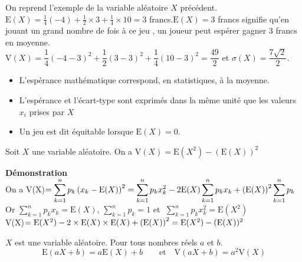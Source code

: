 \begin{example}
On reprend l'exemple de la variable aléatoire $ X $ précédent.\\ $\text{E}(X)=\frac{1}{4}(-4)+\frac{1}{2}\times 3 +\frac{1}{4}\times 10 =3$ francs.\quad $ \text{E}(X)=3$ francs    signifie qu'en jouant un grand  nombre de fois  à ce jeu , un joueur peut espérer gagner $ 3$ francs    en moyenne.\\ $ \text{V}(X)= \dfrac{1}{4}(-4-3)^{2}+\dfrac{1}{2}(3-3)^{2}+\dfrac{1}{4}(10-3)^{2}=\dfrac{49}{2} $ \;\;et \quad $ \sigma(X)=\dfrac{7\sqrt{2}}{2} $.
\end{example}
\begin{remark}
\begin{itemize}
\item   L'espérance mathématique correspond, en statistiques, à la moyenne.
\item L'espérance et l'écart-type sont exprimés dans la même unité que les valeurs $ x_{i} $ prises par $ X $
\item Un jeu est dit équitable lorsque $ \text{E}(X)=0.$
\end{itemize}
\end{remark}
\begin{property}
Soit $ X  $ une  variable aléatoire. On a \; $ \text{V}(X)=  \text{E}(X^{2})- (\text{E}(X))^{2} $
\end{property}
\textbf{Démonstration}\\
On a V(X)$ =\displaystyle\sum_{k=1}^n p_{k}\left(x_{k}-\text{E}(X)\right)^{2}=\displaystyle\sum_{k=1}^n p_{k}x_{k}^{2}-2\text{E}(X)\displaystyle\sum_{k=1}^n p_{k}x_{k}+ \left(\text{E}(X)\right)^{2}\displaystyle\sum_{k=1}^n p_{k}$\\
Or $\displaystyle \sum_{k=1}^n p_{k}x_{k}=\text{E}(X) $,\;  $\displaystyle\sum_{k=1}^n p_{k}=1  $\; et  $\;\displaystyle \sum_{k=1}^n p_{k}x_{k}^{2}=\text{E}(X^{2}) $\\

V(X)$ =\text{E}(X^{2})-2\times \text{E}(X)\times \text{E}(X)+\left(\text{E}(X)\right)^{2} =\text{E}(X^{2})- (\text{E}(X))^{2}$

\begin{property}[Admise]
$ X $  est une  variable aléatoire. Pour  tous nombres réels $a $ et $b $.
 $$\text{E}(aX+b)=a\text{E}(X)+b     \qquad  \text{et} \quad  \text{V}(aX+b)=a^{2}\text{V}(X) $$
\end{property}

   

